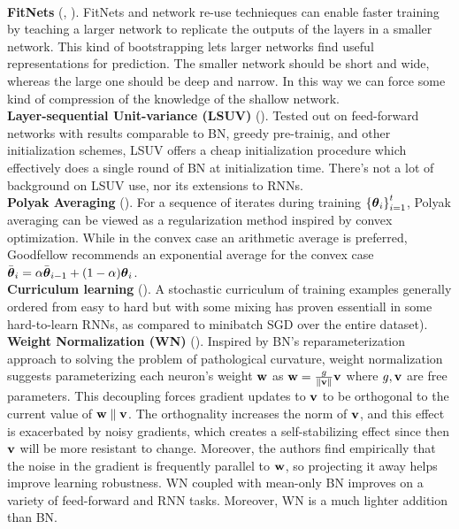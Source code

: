 \documentclass{article}
\begin{document}
\\
\noindent
\textbf{FitNets} (, ). FitNets and network re-use technieques can enable faster training by teaching a larger network to replicate the outputs of the layers in a smaller network. This kind of bootstrapping lets larger networks find useful representations for prediction. The smaller network should be short and wide, whereas the large one should be deep and narrow. In this way we can force some kind of compression of the knowledge of the shallow network.
\\
\noindent
\textbf{Layer-sequential Unit-variance (LSUV)} (). Tested out on feed-forward networks with results comparable to BN, greedy pre-trainig, and other initialization schemes, LSUV offers a cheap initialization procedure which effectively does a single round of BN at initialization time. There's not a lot of background on LSUV use, nor its extensions to RNNs.
\\
\noindent
\textbf{Polyak Averaging} (). For a sequence of iterates during training $\left\{{{\boldsymbol\theta}_i}\right\}_{i=1}^t$, Polyak averaging can be viewed as a regularization method inspired by convex optimization. While in the convex case an arithmetic average is preferred, Goodfellow recommends an exponential average for the convex case $\bar{{\boldsymbol\theta}}_i=\alpha \bar{{\boldsymbol\theta}}_{i-1}+(1-\alpha){\boldsymbol\theta}_{i}$.
\\
\noindent
\textbf{Curriculum learning} (). A stochastic curriculum of training examples generally ordered from easy to hard but with some mixing has proven essentiall in some hard-to-learn RNNs, as compared to minibatch SGD over the entire dataset).
\\
\noindent
\textbf{Weight Normalization (WN)} (). Inspired by BN's reparameterization approach to solving the problem of pathological curvature, weight normalization suggests parameterizing each neuron's weight $\textbf{w}$ as $\textbf{w}=\frac{g}{\left\| \textbf{v} \right\|}\textbf{v}$ where $g,\textbf{v}$ are free parameters. This decoupling forces gradient updates to $\textbf{v}$ to be orthogonal to the current value of $\textbf{w}\parallel\textbf{v}$. The orthognality increases the norm of $\textbf{v}$, and this effect is exacerbated by noisy gradients, which creates a self-stabilizing effect since then $\textbf{v}$ will be more resistant to change. Moreover, the authors find empirically that the noise in the gradient is frequently parallel to $\textbf{w}$, so projecting it away helps improve learning robustness. WN coupled with mean-only BN improves on a variety of feed-forward and RNN tasks. Moreover, WN is a much lighter addition than BN.
\end{document}
